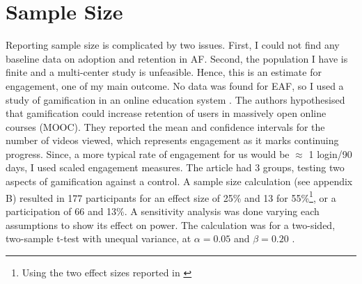 \section{Sample Size}
Reporting sample size is complicated by two issues. First, I could not find any baseline data on adoption and retention in \gls{AF}. Second, the population I have is finite and a multi-center study is unfeasible. Hence, this is an estimate for engagement, one of my main outcome. No data was found for \gls{EAF}, so I used a study of gamification in an online education system  \cite{krause2015playful}. The authors hypothesised that gamification could increase retention of users in massively open online courses (MOOC). They reported the mean and confidence intervals for the number of videos viewed, which represents engagement as it marks continuing progress. Since, a more typical rate of engagement for us would be $\approx$ 1 login/90 days, I used scaled engagement measures. The article had 3 groups, testing two aspects of gamification against a control. A sample size calculation (see appendix B) resulted in 177 participants for an effect size of 25\% and 13 for 55\%\footnote{Using the two effect sizes reported in \cite{lachin1981introduction}}, or a participation of 66 and 13\%. A sensitivity analysis was done varying each assumptions to show its effect on power. The calculation was for a two-sided, two-sample t-test with unequal variance, at $\alpha = 0.05$ and $\beta = 0.20$ \cite{lachin1981introduction}.

